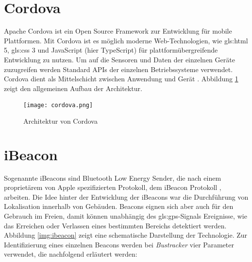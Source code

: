 
\section{Cordova}
\label{sec:Cordova}
Apache Cordova ist ein Open Source Framework zur Entwicklung für mobile Plattformen. Mit Cordova ist es möglich moderne Web-Technologien, wie \gls{gls:html} 5, \gls{gls:css} 3 und JavaScript (hier TypeScript) für plattformübergreifende Entwicklung zu nutzen. Um auf die Sensoren und Daten der einzelnen Geräte zuzugreifen werden Standard APIs der einzelnen Betriebssysteme verwendet. Cordova dient als Mittelschicht zwischen Anwendung und Gerät \cite{cordovaDoku}. Abbildung \ref{img:cordova} zeigt den allgemeinen Aufbau der Architektur.
\begin{figure}[htbp]
	\centering
	\texttt{[image: cordova.png]}
	\caption{Architektur von Cordova \cite{cordovaDoku}}
	\label{img:cordova}
\end{figure}

\section{iBeacon}
Sogenannte iBeacons sind Bluetooth Low Energy Sender, die nach einem proprietärem von Apple spezifizierten Protokoll, dem iBeacon Protokoll \cite{iBeaconSpec}, arbeiten. Die Idee hinter der Entwicklung der iBeacons war die Durchführung von Lokalisation innerhalb von Gebäuden. Beacons eignen sich aber auch für den Gebrauch im Freien, damit können unabhängig des \gls{gls:gps}-Signals Ereignisse, wie das Erreichen oder Verlassen eines bestimmten Bereichs detektiert werden. Abbildung \ref{img:ibeacon} zeigt eine schematische Darstellung der Technologie.
Zur Identifizierung eines einzelnen Beacons werden bei \emph{Bustracker} vier Parameter verwendet, die nachfolgend erläutert werden:

